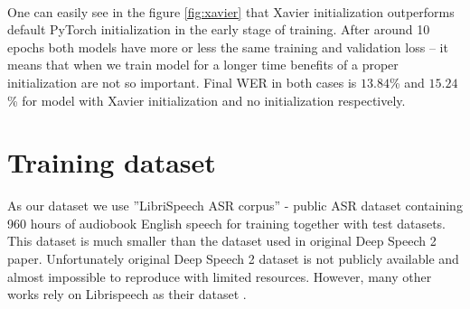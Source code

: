 \documentclass[licencjacka,en]{pracamgr}
\begin{document}
	\noindent%
	\begin{minipage}{\linewidth}%
		\label{fig:xavier}		     
	\end{minipage}\\
	
	
	One can easily see in the figure \ref{fig:xavier} that Xavier initialization outperforms default PyTorch initialization in the early stage of training. After around 10 epochs both models have more or less the same training and validation loss -- it means that when we train model for a longer time benefits of a proper initialization are not so important. Final WER in both cases is $13.84$\% and $15.24$\% for model with Xavier initialization and no initialization respectively.
	
	\section{Training dataset}
	As our dataset we use ''LibriSpeech ASR corpus'' \cite{DATA} - public ASR dataset containing 960 hours of audiobook English speech for training together with test datasets. This dataset is much smaller than the dataset used in original Deep Speech 2 paper. Unfortunately original Deep Speech 2 dataset is not publicly available and almost impossible to reproduce with limited resources. However, many other works rely on Librispeech as their dataset \cite{LIBRI-EX}.
	
\end{document}
